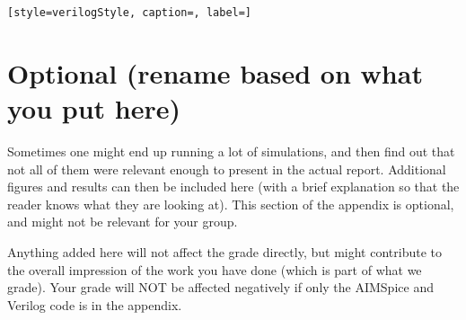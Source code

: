 \begin{lstlisting}[style=verilogStyle, caption=, label=]
\end{lstlisting}

\section{Optional (rename based on what you put here)}
Sometimes one might end up running a lot of simulations, and then find out that not all of them were relevant enough to present in the actual report. Additional figures and results can then be included here (with a brief explanation so that the reader knows what they are looking at). This section of the appendix is optional, and might not be relevant for your group. 

Anything added here will not affect the grade directly, but might contribute to the overall impression of the work you have done (which is part of what we grade). Your grade will NOT be affected negatively if only the AIMSpice and Verilog code is in the appendix.